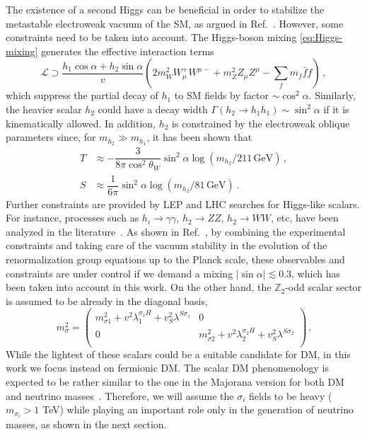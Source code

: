 \documentclass[12pt,letterpaper]{article}
\begin{document}
The existence of a second Higgs can be beneficial in order to stabilize the metastable electroweak vacuum of the SM, as argued in Ref.~\cite{Falkowski:2015iwa}. However, some constraints need to be taken into account. The Higgs-boson mixing \eqref{eq:Higgs-mixing} generates the effective interaction terms
\begin{equation}
\label{eq:higgs-couplings}
\mathcal{L} \supset \dfrac{h_1\cos\alpha+h_2\sin\alpha}{v}
\left(2m_W^2W_{\mu}^{+}W^{\mu -}+m_Z^2Z_{\mu}Z^{\mu}-\sum_f m_f \bar{f}f\right)\,,
\end{equation}
which suppress the partial decay of $h_1$ to SM fields by factor $\sim\cos^2\alpha$.
Similarly, the heavier scalar $h_2$ could have a decay width $\Gamma(h_2\to h_1h_1)\sim \sin^2\alpha$ if it is kinematically allowed. 
In addition, $h_2$ is constrained by the electroweak oblique parameters since, for $m_{h_2} \gg m_{h_1}$, it has been shown that~\cite{Falkowski:2015iwa}
\begin{align}
\label{eq:T}
T& \approx-\dfrac{3}{8\pi\cos^2\theta_W}\sin^2\alpha\log(m_{h_2}/211\,\text{GeV})\,,\\
S& \approx\dfrac{1}{6\pi}\sin^2\alpha\log(m_{h_2}/81\,\text{GeV})\,.
\end{align}
Further constraints are provided by LEP and LHC searches for Higgs-like scalars. For instance, processes such as $h_i\to\gamma\gamma$, $h_2\to ZZ$, $h_2\to WW$, etc, have been analyzed in the literature~\cite{Aaboud:2018xdt,ATLAS:2018uso,Sirunyan:2018ouh,Khachatryan:2015cwa}.
As shown in Ref.~\cite{Falkowski:2015iwa}, by combining the experimental constraints and taking care of the vacuum stability in the evolution of the renormalization group equations up to the Planck scale, these observables and constraints are under control if we demand a mixing $|\sin\alpha| \lesssim 0.3$, which has been taken into account in this work.
On the other hand, the $\mathbb{Z}_2$-odd scalar sector is assumed to be already in the diagonal basis,
\begin{equation}
\label{eq:ms-matrix}
m_\sigma^2=
\left(
\begin{array}{cc}
 m_{\text{$\sigma $1}}^2+ v^2 \lambda_1^{\sigma_1 H} 
 + v_S^2 \lambda^{S\sigma_1}& 0 \\
 0 & m_{\text{$\sigma $2}}^2+ v^2 \lambda _2^{\sigma_2 H}
 + v_S^2 \lambda^{S\sigma_2} \\
\end{array}
\right)\,.
\end{equation}
While the lightest of these scalars could be a suitable candidate for DM, in this work we focus instead on fermionic DM. The scalar DM phenomenology is expected to be rather similar to the one in the Majorana version for both DM and neutrino masses~\cite{Restrepo:2013aga, Restrepo:2015ura}. Therefore, we will assume the $\sigma_i$ fields to be heavy ($m_{\sigma_i} > 1$ TeV) while playing  an important role only in the generation of neutrino masses, as shown in the next section.
\end{document}
